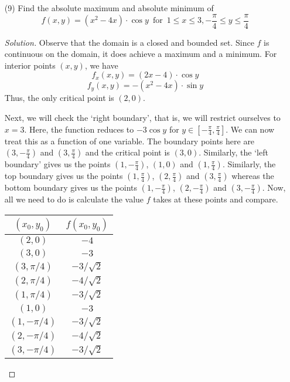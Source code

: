 \documentclass[12pt]{article}
\newcommand*{\thead}[1]{\multicolumn{1}{c}{\bfseries #1}}
\theoremstyle{definition}
\newenvironment{soln}{\begin{proof}[Solution]}{\end{proof}}
\begin{document}
\begin{enumerate}[leftmargin=*]
    \newpage
    
    \item[(9)] Find the absolute maximum and absolute minimum of 
    \[
        f(x,y) = \left( x^2 - 4x \right) \cdot \cos y \, \text{ for } \, 1 \leq x \leq 3, -\frac{\pi}{4} \leq y \leq \frac{\pi}{4}
    \]
    \begin{soln}
        Observe that the domain is a closed and bounded set. Since $f$ is continuous on the domain, it does achieve a maximum and a minimum. For interior points $(x,y)$, we have
        \[
        f_x(x,y) = \left( 2x - 4 \right) \cdot \cos y
        \]
        \[
            f_y(x,y) = - \left( x^2 - 4x \right) \cdot \sin y
        \]
        Thus, the only critical point is $(2,0)$. 
        
        \medskip
        
        Next, we will check the `right boundary', that is, we will restrict ourselves to $x = 3$. Here, the function reduces to $-3\cos y$ for $y \in \left[ -\frac{\pi}{4}, \frac{\pi}{4} \right]$. We can now treat this as a function of one variable. The boundary points here are $\left(3,-\frac{\pi}{4}\right)$ and $\left(3, \frac{\pi}{4}\right)$ and the critical point is $(3,0)$. Similarly, the `left boundary' gives us the points $\left( 1, -\frac{\pi}{4} \right)$, $(1,0)$ and $\left(1, \frac{\pi}{4} \right)$. Similarly, the top boundary gives us the points $\left( 1, \frac{\pi}{4} \right)$, $\left( 2, \frac{\pi}{4} \right)$ and $\left( 3, \frac{\pi}{4} \right)$ whereas the bottom boundary gives us the points $\left( 1, -\frac{\pi}{4} \right)$, $\left( 2, -\frac{\pi}{4} \right)$ and $\left( 3, -\frac{\pi}{4} \right)$. Now, all we need to do is calculate the value $f$ takes at these points and compare. 
        
        \medskip
        \begin{center}
            \begin{tabular}{|c|c|}
            \thead{$(x_0, y_0)$} & \thead{$f(x_0, y_0)$} \\
            \hline 
            $(2,0)$ & $-4$ \\
            \hline
            $(3,0)$ & $-3$ \\
            \hline
            $(3, \pi/4)$ & $-3/\sqrt{2}$ \\
            \hline
            $(2, \pi/4)$ & $-4/\sqrt{2}$ \\
            \hline
            $(1, \pi/4)$ & $-3/\sqrt{2}$ \\
            \hline
            $(1,0)$ & $-3$ \\
            \hline
            $(1,-\pi/4)$ & $-3/\sqrt{2}$ \\
            \hline
            $(2, -\pi/4)$ & $-4/\sqrt{2}$ \\
            \hline
            $(3, -\pi/4)$ & $-3/\sqrt{2}$ \\
            \hline
            \end{tabular}
        \end{center}
        

\end{soln}
\end{enumerate}
\end{document}
